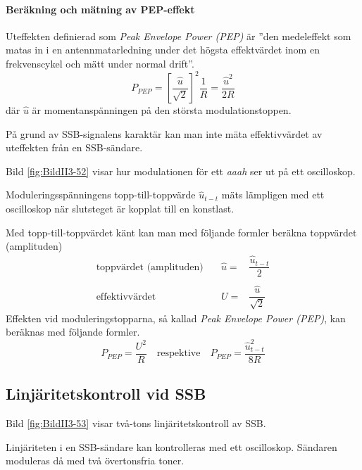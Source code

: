 \paragraph{Beräkning och mätning av PEP-effekt}

Uteffekten definierad som \emph{Peak Envelope Power (PEP)} \cite[1.157]{ITU-RR}
är ''den medeleffekt som matas in i en antennmatarledning under det högsta
effektvärdet inom en frekvenscykel och mätt under normal drift''.
%
\[P_{PEP} = \left[\dfrac{\hat{u}}{\sqrt{2}}\right]^2\dfrac{1}{R} =  \dfrac{\hat{u}^2}{2R}\]
%
där \(\hat{u}\) är momentanspänningen på den största modulationstoppen.


På grund av SSB-signalens karaktär kan man inte mäta effektivvärdet av
uteffekten från en SSB-sändare.

Bild \ref{fig:BildII3-52} visar hur modulationen för ett \emph{aaah} ser ut
på ett oscilloskop.

Moduleringsspänningens topp-till-topp\-värde \(\hat{u}_{t-t}\) mäts lämpligen med ett
oscilloskop när slutsteget är kopplat till en konstlast.

Med topp-till-toppvärdet känt kan man med följande formler beräkna
toppvärdet (amplituden)
%
\[
\begin{array}{lll}
\text{toppvärdet (amplituden)} &  \quad \hat{u}= & \dfrac{\hat{u}_{t-t}}{2}\\
& & \\
\text{effektivvärdet} &\quad  U =& \dfrac{\hat{u}}{\sqrt{2}}
\end{array}
\]%
%
Effekten vid moduleringstopparna, så kallad \emph{Peak Envelope Power (PEP)},
kan beräknas med följande formler.
%
\[
P_{PEP} = \dfrac{U^2}{R} \quad\text{respektive}\quad
P_{PEP} = \dfrac{\hat{u}_{t-t}^2}{8R}
\]

\subsection{Linjäritetskontroll vid SSB}


Bild \ref{fig:BildII3-53} visar två-tons linjäritetskontroll av SSB.

Linjäriteten i en SSB-sändare kan kontrolleras med ett oscilloskop.
Sändaren moduleras då med två övertonsfria toner.


